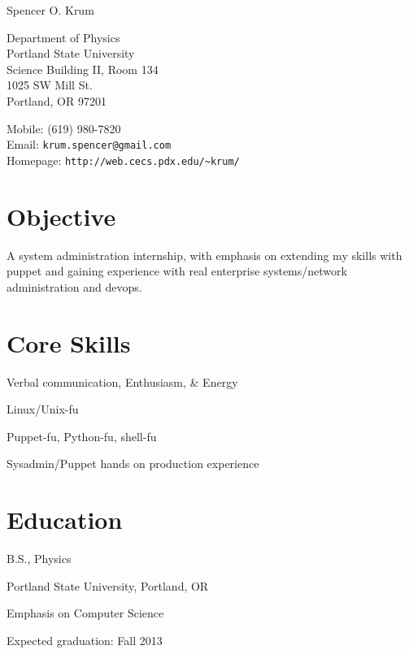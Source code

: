 \documentclass[10pt,letterpaper]{article}
\def\name{Spencer O. Krum}
\renewenvironment{itemize}{
  \begin{list}{}{
    \setlength{\leftmargin}{1.5em}
    \setlength{\itemsep}{0.25em}
    \setlength{\parskip}{0pt}
    \setlength{\parsep}{0.25em}
  }
}{
  \end{list}
}
\begin{document}
{\huge \name}


\vspace{0.25in}

\begin{minipage}[t]{0.5\textwidth}
  Department of Physics \\
  Portland State University \\
  Science Building II, Room 134 \\
  1025 SW Mill St. \\
  Portland, OR 97201
\end{minipage}
\begin{minipage}[t]{0.5\textwidth}
  Mobile: (619) 980-7820 \\
  Email: \texttt{krum.spencer@gmail.com} \\
  Homepage: \texttt{http://web.cecs.pdx.edu/\textasciitilde krum/} \\
\end{minipage}

\section*{Objective}

A system administration internship, with emphasis on extending my skills with puppet and gaining experience with real enterprise systems/network administration and devops. \\

\begin{minipage}[t]{0.5\textwidth}
\section*{Core Skills}
\begin{itemize}
\item Verbal communication, Enthusiasm, \& Energy
\item Linux/Unix-fu
\item Puppet-fu, Python-fu, shell-fu
\item Sysadmin/Puppet hands on production experience
\end{itemize}
\end{minipage}
\begin{minipage}[t]{0.5\textwidth}
\section*{Education}
\begin{itemize}

  \item B.S., Physics
  \item Portland State University, Portland, OR
  \item Emphasis on Computer Science
  \item Expected graduation: Fall 2013
  
\end{itemize}
\end{minipage}
\end{document}
